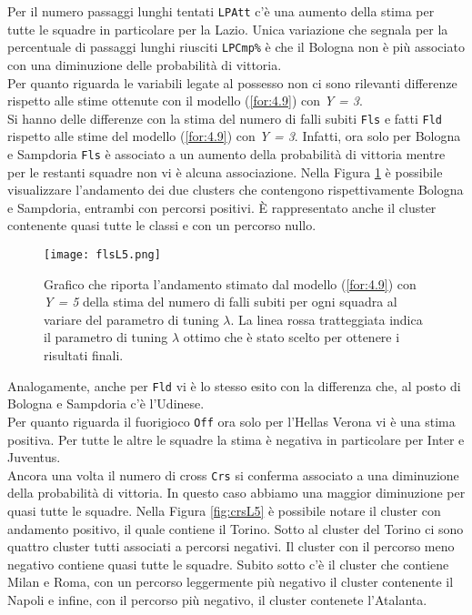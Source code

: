 Per il numero passaggi lunghi tentati \texttt{LPAtt} c'è una aumento della stima per tutte le squadre in particolare per la Lazio. Unica variazione che segnala per la percentuale di passaggi lunghi riusciti \texttt{LPCmp\%} è che il Bologna non è più associato con una diminuzione delle probabilità di vittoria.\\
Per quanto riguarda le variabili legate al possesso non ci sono rilevanti differenze rispetto alle stime ottenute con il modello (\ref{for:4.9}) con \emph{Y = 3}.\\
Si hanno delle differenze con la stima del numero di falli subiti \texttt{Fls} e fatti \texttt{Fld} rispetto alle stime del modello (\ref{for:4.9}) con \emph{Y = 3}. Infatti, ora solo per Bologna e Sampdoria \texttt{Fls} è associato a un aumento della probabilità di vittoria mentre per le restanti squadre non vi è alcuna associazione. Nella Figura \ref{fig:flsL5} è possibile visualizzare l'andamento dei due clusters che contengono rispettivamente Bologna e Sampdoria, entrambi con percorsi positivi. È rappresentato anche il cluster contenente quasi tutte le classi e con un percorso nullo.
\begin{figure}[htbp]
	\begin{center}
		\texttt{[image: flsL5.png]}
		\caption{Grafico che riporta l'andamento stimato dal modello (\ref{for:4.9}) con \emph{Y = 5} della stima del numero di falli subiti per ogni squadra al variare del parametro di tuning $\lambda$. La linea rossa tratteggiata indica il parametro di tuning $\lambda$ ottimo che è stato scelto per ottenere i risultati finali.} \label{fig:flsL5}
	\end{center}
\end{figure}
Analogamente, anche per \texttt{Fld} vi è lo stesso esito con la differenza che, al posto di Bologna e Sampdoria c'è l'Udinese.\\
Per quanto riguarda il fuorigioco \texttt{Off} ora solo per l'Hellas Verona vi è una stima positiva. Per tutte le altre le squadre la stima è negativa in particolare per Inter e Juventus.\\
Ancora una volta il numero di cross \texttt{Crs} si conferma associato a una diminuzione della probabilità di vittoria. In questo caso abbiamo una maggior diminuzione per quasi tutte le squadre. Nella Figura \ref{fig:crsL5} è possibile notare il cluster con andamento positivo, il quale contiene il Torino. Sotto al cluster del Torino ci sono quattro cluster tutti associati a percorsi negativi. Il cluster con il percorso meno negativo contiene quasi tutte le squadre. Subito sotto c'è il cluster che contiene Milan e Roma, con un percorso leggermente più negativo il cluster contenente il Napoli e infine, con il percorso più negativo, il cluster contenete l'Atalanta.
